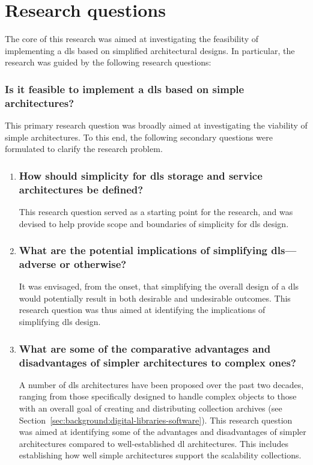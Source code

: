 \section{Research questions}
\label{sec:introduction:research-questions}


The core of this research was aimed at investigating the feasibility of implementing a \gls{dls} based on simplified architectural designs. In particular, the research was guided by the following research questions:

\subsubsection*{Is it feasible to implement a \gls{dls} based on simple architectures?}
 
This primary research question was broadly aimed at investigating the viability of simple architectures. To this end, the following secondary questions were formulated to clarify the research problem.

\begin{enumerate}[label=\roman*]
\item \subsubsection*{How should simplicity for \gls{dls} storage and service architectures be defined?}
This research question served as a starting point for the research, and was devised to help provide scope and boundaries of simplicity for \gls{dls} design.
\item \subsubsection*{What are the potential implications of simplifying \gls{dls}---adverse or otherwise?}
It was envisaged, from the onset, that simplifying the overall design of a \gls{dls} would potentially result in both desirable and undesirable outcomes. This research question was thus aimed at identifying the implications of simplifying \gls{dls} design.
\item \subsubsection*{What are some of the comparative advantages and disadvantages of simpler architectures to complex ones?}
A number of \gls{dls} architectures have been proposed over the past two decades, ranging from those specifically designed to handle complex objects to those with an overall goal of creating and distributing collection archives (see Section~\ref{sec:background:digital-libraries-software}). This research question was aimed at identifying some of the advantages and disadvantages of simpler architectures compared to well-established \gls{dl} architectures. This includes establishing how well simple architectures support the scalability collections.
\end{enumerate} 